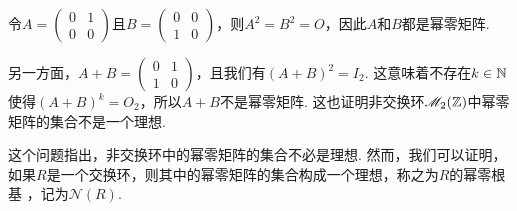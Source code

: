 \begin{solution}
  令$A=\begin{pmatrix}
    0 & 1 \\
    0 & 0
  \end{pmatrix}$且$B=\begin{pmatrix}
    0 & 0 \\
    1 & 0
  \end{pmatrix}$，则$A^2=B^2=O$，因此$A$和$B$都是幂零矩阵.

  另一方面，$A+B=\begin{pmatrix}
    0 & 1 \\
    1 & 0
  \end{pmatrix}$，且我们有$(A+B)^2=I_2$. 这意味着不存在$k\in\mathbb N$使得$(A+B)^k=O_2$，所以$A+B$不是幂零矩阵. 这也证明非交换环$\mathscr M_2(\mathbb Z)$中幂零矩阵的集合不是一个理想.
\end{solution}
\begin{nota}
  这个问题指出，非交换环中的幂零矩阵的集合不必是理想. 然而，我们可以证明，如果$R$是一个交换环，则其中的幂零矩阵的集合构成一个理想，称之为$R$的{\kaishu 幂零根基}
  ，记为$\mathscr N(R)$.
\end{nota}

